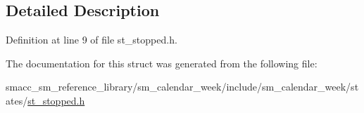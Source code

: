 \subsection{Detailed Description}


Definition at line 9 of file st\+\_\+stopped.\+h.



The documentation for this struct was generated from the following file\+:\begin{DoxyCompactItemize}
\item 
smacc\+\_\+sm\+\_\+reference\+\_\+library/sm\+\_\+calendar\+\_\+week/include/sm\+\_\+calendar\+\_\+week/states/\hyperlink{sm__calendar__week_2include_2sm__calendar__week_2states_2st__stopped_8h}{st\+\_\+stopped.\+h}\end{DoxyCompactItemize}
